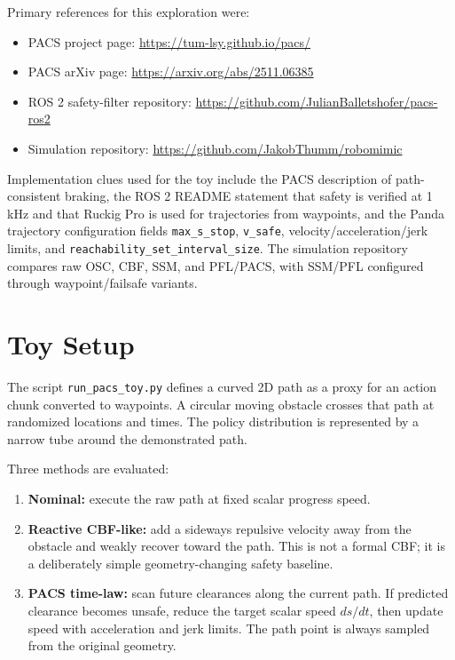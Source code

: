\documentclass[11pt]{article}
\begin{document}
Primary references for this exploration were:
\begin{itemize}[leftmargin=1.5em]
  \item PACS project page: \url{https://tum-lsy.github.io/pacs/}
  \item PACS arXiv page: \url{https://arxiv.org/abs/2511.06385}
  \item ROS 2 safety-filter repository: \url{https://github.com/JulianBalletshofer/pacs-ros2}
  \item Simulation repository: \url{https://github.com/JakobThumm/robomimic}
\end{itemize}

Implementation clues used for the toy include the PACS description of path-consistent braking, the ROS 2 README statement that safety is verified at 1 kHz and that Ruckig Pro is used for trajectories from waypoints, and the Panda trajectory configuration fields \texttt{max\_s\_stop}, \texttt{v\_safe}, velocity/acceleration/jerk limits, and \texttt{reachability\_set\_interval\_size}. The simulation repository compares raw OSC, CBF, SSM, and PFL/PACS, with SSM/PFL configured through waypoint/failsafe variants.

\section{Toy Setup}

The script \texttt{run\_pacs\_toy.py} defines a curved 2D path as a proxy for an action chunk converted to waypoints. A circular moving obstacle crosses that path at randomized locations and times. The policy distribution is represented by a narrow tube around the demonstrated path.

Three methods are evaluated:
\begin{enumerate}[leftmargin=1.5em]
  \item \textbf{Nominal:} execute the raw path at fixed scalar progress speed.
  \item \textbf{Reactive CBF-like:} add a sideways repulsive velocity away from the obstacle and weakly recover toward the path. This is not a formal CBF; it is a deliberately simple geometry-changing safety baseline.
  \item \textbf{PACS time-law:} scan future clearances along the current path. If predicted clearance becomes unsafe, reduce the target scalar speed \(ds/dt\), then update speed with acceleration and jerk limits. The path point is always sampled from the original geometry.
\end{enumerate}
\end{document}
